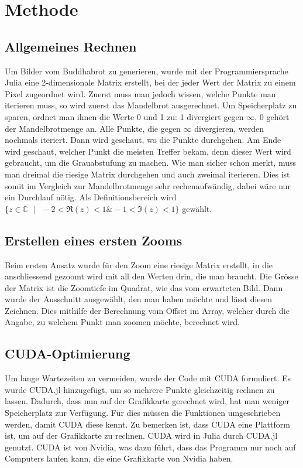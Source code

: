 \section{Methode}
\subsection{Allgemeines Rechnen}
Um Bilder vom Buddhabrot zu generieren, wurde mit der Programmiersprache Julia eine 2-dimensionale Matrix erstellt, bei der jeder Wert der Matrix zu einem Pixel zugeordnet wird. Zuerst muss man jedoch wissen, welche Punkte man iterieren muss, so wird zuerst das Mandelbrot ausgerechnet. Um Speicherplatz zu sparen, ordnet man ihnen die Werte 0 und 1 zu: 1 divergiert gegen $\infty$, 0 gehört der Mandelbrotmenge an. Alle Punkte, die gegen $\infty$ divergieren, werden nochmals iteriert. Dann wird geschaut, wo die Punkte durchgehen. Am Ende wird geschaut, welcher Punkt die meisten Treffer bekam, denn dieser Wert wird gebraucht, um die Grauabstufung zu machen. Wie man sicher schon merkt, muss man dreimal die riesige Matrix durchgehen und auch zweimal iterieren. Dies ist somit im Vergleich zur Mandelbrotmenge sehr rechenaufwändig, dabei wäre nur ein Durchlauf nötig. Als Definitionsbereich wird $\{z \in \mathbb{C}\text{ }|\text{ }-2 < \Re(z) < 1 \& -1 < \Im(z) < 1\}$ gewählt.
\subsection{Erstellen eines ersten Zooms}
Beim ersten Ansatz wurde für den Zoom eine riesige Matrix erstellt, in die anschliessend gezoomt wird mit all den Werten drin, die man braucht. Die Grösse der Matrix ist die Zoomtiefe im Quadrat, wie das vom erwarteten Bild. Dann wurde der Ausschnitt ausgewählt, den man haben möchte und lässt diesen Zeichnen. Dies mithilfe der Berechnung vom Offset im Array, welcher durch die Angabe, zu welchem Punkt man zoomen möchte, berechnet wird.
\subsection{CUDA-Optimierung}
Um lange Wartezeiten zu vermeiden, wurde der Code mit CUDA formuliert. Es wurde CUDA.jl hinzugefügt, um so mehrere Punkte gleichzeitig rechnen zu lassen. Dadurch, dass nun auf der Grafikkarte gerechnet wird, hat man weniger Speicherplatz zur Verfügung. Für dies müssen die Funktionen umgeschrieben werden, damit CUDA diese kennt. Zu bemerken ist, dass CUDA eine Plattform ist, um auf der Grafikkarte zu rechnen. CUDA wird in Julia durch CUDA.jl genutzt. CUDA ist von Nvidia, was dazu führt, dass das Programm nur noch auf Computers laufen kann, die eine Grafikkarte von Nvidia haben.
